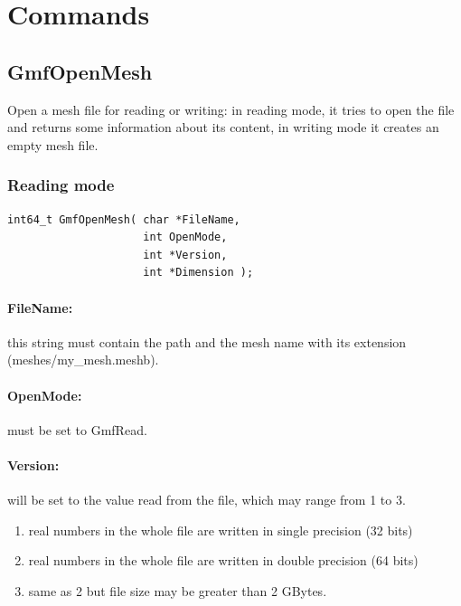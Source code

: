 \documentclass[a4paper,12pt]{article}
\begin{document}
%
%

\newpage
\section{Commands}

\subsection{GmfOpenMesh}
Open a mesh file for reading or writing: in reading mode, it tries to open the file and returns some information about its content, in writing mode it creates an empty mesh file.

\subsubsection{Reading mode}
\begin{tt}
\begin{verbatim}
int64_t GmfOpenMesh( char *FileName,
                     int OpenMode,
                     int *Version,
                     int *Dimension );
\end{verbatim}
\end{tt}
\normalfont

\paragraph{FileName:}
this string must contain the path and the mesh name with its extension (meshes/my\_mesh.meshb).

\paragraph{OpenMode:}
must be set to GmfRead.

\paragraph{Version:}
will be set to the value read from the file, which may range from 1 to 3.

\begin{enumerate}
	\item real numbers in the whole file are written in single precision (32 bits)
	\item real numbers in the whole file are written in double precision (64 bits)
	\item same as 2 but file size may be greater than 2 GBytes.
\end{enumerate}
\end{document}

